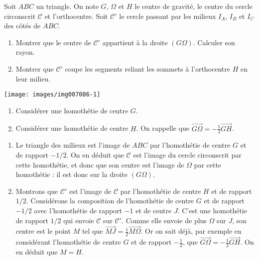 \begin{exo}[Cercle d'Euler]
Soit $ABC$ un triangle. On note $G$, $\Omega$ et $H$ le centre de gravité, le centre du cercle circonscrit $\mathcal C$ et l'orthocentre. Soit $\mathcal C'$ le cercle passant par les milieux $I_A$, $I_B$ et $I_C$ des côtés de $ABC$.
\begin{enumerate}
\item Montrer que le centre de $\mathcal C'$ appartient à la droite $(G\Omega)$. Calculer son rayon.
\item Montrer que $\mathcal C'$ coupe les segments reliant les sommets à l'orthocentre $H$ en leur milieu.
\end{enumerate}
\begin{center}
\texttt{[image: images/img007086-1]}
\end{center}


\begin{hint}   
\begin{enumerate}
\item Considérer une homothétie de centre $G$.
\item Considérer une homothétie de centre $H$. On rappelle que $\overrightarrow{G\Omega}=-\frac12\overrightarrow{GH}$.
\end{enumerate}
\end{hint}      
\begin{sol} 
\begin{enumerate}
\item Le triangle des milieux est l'image de $ABC$ par l'homothétie de centre $G$ et de rapport $-1/2$. On en déduit que $\mathcal C$ est l'image du cercle circonscrit par cette homothétie, et donc que son centre est l'image de $\Omega$ par cette homothétie : il est donc sur la droite $(G\Omega)$.

\item Montrons que $\mathcal C'$ est l'image de $\mathcal C$ par l'homothétie de centre $H$ et de rapport $1/2$. Considérons la composition de l'homothétie de centre $G$ et de rapport $-1/2$ avec l'homothétie de rapport $-1$ et de centre $J$. C'est une homothétie de rapport $1/2$ qui envoie $\mathcal C$ sur $\mathcal C'$. Comme elle envoie de plus $\Omega$ sur $J$, son centre est le point $M$ tel que $\overrightarrow{MJ}=\frac12\overrightarrow{M\Omega}$. Or on sait déjà, par exemple en considérant l'homothétie de centre $G$ et de rapport $-\frac12$, que $\overrightarrow{G\Omega}=-\frac12\overrightarrow{GH}$. On en déduit que $M=H$.
\end{enumerate}
\end{sol}  
\end{exo} 




